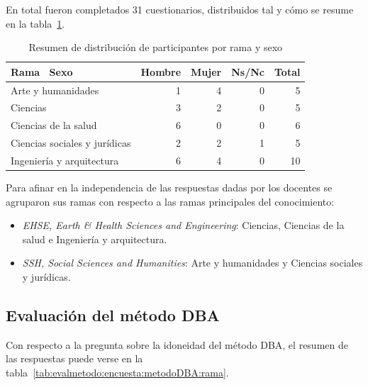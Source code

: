 En total fueron completados 31 cuestionarios, distribuidos tal y cómo se resume en la tabla~\ref{tab:evalmetodo:encuesta:rama:sexo}.

\begin{table}[H]
  \begin{center}
  \begin{tabular}{| l | r | r | r | r |}
    \hline
    Rama \ Sexo & Hombre & Mujer & Ns/Nc & Total \\
    \hline
    \hline
    Arte y humanidades & 1 & 4 & 0 & 5  \\
    \hline
    Ciencias & 3 & 2 & 0 & 5  \\
    \hline
    Ciencias de la salud & 6 & 0 & 0 & 6  \\
    \hline
    Ciencias sociales y jurídicas & 2 & 2 & 1 & 5  \\
    \hline
    Ingeniería y arquitectura & 6 & 4 & 0 & 10 \\
    \hline
  \end{tabular}
\end{center}
\caption{Resumen de distribución de participantes por rama y sexo}
\label{tab:evalmetodo:encuesta:rama:sexo}
\end{table}

Para afinar en la independencia de las respuestas dadas por los docentes se agruparon sus ramas con respecto a las ramas principales del conocimiento:

\begin{itemize}
\item \emph{EHSE, Earth \& Health Sciences and Engineering}: Ciencias, Ciencias de la salud e Ingeniería y arquitectura.
\item \emph{SSH, Social Sciences and Humanities}: Arte y humanidades y Ciencias sociales y jurídicas.
\end{itemize}

\subsection{Evaluación del método DBA}

Con respecto a la pregunta sobre la idoneidad del método DBA, el resumen de las respuestas puede verse en la tabla~\ref{tab:evalmetodo:encuesta:metodoDBA:rama}.

